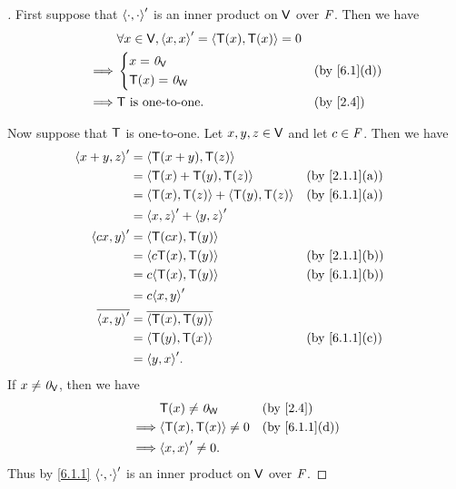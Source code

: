 \begin{proof}[]
  First suppose that \(\left\langle\cdot, \cdot\right\rangle'\) is an inner product on \(\mathsf{V}\) over \(\mathit{F}\).
  Then we have
  \begin{align*}
             & \forall x \in \V, \inn{x, x}' = \inn{\T(x), \T(x)} = 0               \\
    \implies & \begin{dcases}
                 x = \zv_{\V} \\
                 \T(x) = \zv_{\W}
               \end{dcases}                                       &  & \by{6.1}[d]  \\
    \implies & \T \text{ is one-to-one}.                              &  & \by{2.4}
  \end{align*}

  Now suppose that \(\mathsf{T}\) is one-to-one.
  Let \(x, y, z \in \mathsf{V}\) and let \(c \in \mathit{F}\).
  Then we have
  \begin{align*}
    \inn{x + y, z}'    & = \inn{\T(x + y), \T(z)}                                     \\
                       & = \inn{\T(x) + \T(y), \T(z)}              &  & \by{2.1.1}[a] \\
                       & = \inn{\T(x), \T(z)} + \inn{\T(y), \T(z)} &  & \by{6.1.1}[a] \\
                       & = \inn{x, z}' + \inn{y, z}'                                  \\
    \inn{cx, y}'       & = \inn{\T(cx), \T(y)}                                        \\
                       & = \inn{c \T(x), \T(y)}                    &  & \by{2.1.1}[b] \\
                       & = c \inn{\T(x), \T(y)}                    &  & \by{6.1.1}[b] \\
                       & = c \inn{x, y}'                                              \\
    \conj{\inn{x, y}'} & = \conj{\inn{\T(x), \T(y)}}                                  \\
                       & = \inn{\T(y), \T(x)}                      &  & \by{6.1.1}[c] \\
                       & = \inn{y, x}'.
  \end{align*}
  If \(x \neq \mathit{0}_{\mathsf{V}}\), then we have
  \begin{align*}
             & \T(x) \neq \zv_{\W}       &  & \by{2.4}      \\
    \implies & \inn{\T(x), \T(x)} \neq 0 &  & \by{6.1.1}[d] \\
    \implies & \inn{x, x}' \neq 0.
  \end{align*}
  Thus by \cref{6.1.1} \(\left\langle\cdot, \cdot\right\rangle'\) is an inner product on \(\mathsf{V}\) over \(\mathit{F}\).
\end{proof}

